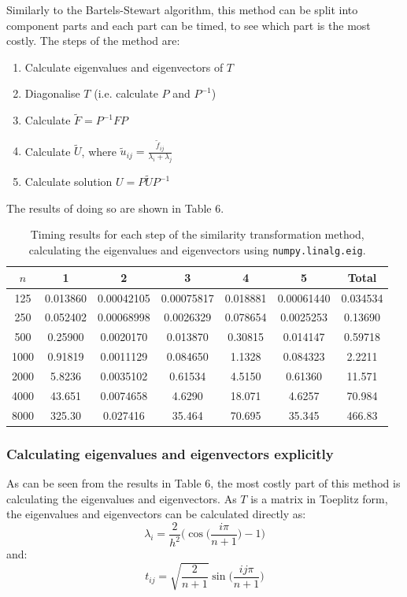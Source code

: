 \documentclass{article}
\numberwithin{equation}{section}
\begin{document}
Similarly to the Bartels-Stewart algorithm, this method can be split into component parts and each part can be timed, to see which part is the most costly. The steps of the method are:
\begin{enumerate}
\item Calculate eigenvalues and eigenvectors of $T$
\item Diagonalise $T$ (i.e. calculate $P$ and $P^{-1}$)
\item Calculate $\widetilde{F}=P^{-1}FP$
\item Calculate $\widetilde{U}$, where $\widetilde{u}_{ij} = \frac{\widetilde{f}_{ij}}{\lambda_i + \lambda_j}$
\item Calculate solution $U=P \widetilde{U}P^{-1}$
\end{enumerate}

The results of doing so are shown in Table 6.

\begin{table}[H]
\centering
\begin{tabular}{|c|c|c|c|c|c|c|}
\hline
$n$ & 1 & 2 & 3 & 4 & 5 & Total \\
\hline
125 & 0.013860 & 0.00042105 & 0.00075817 & 0.018881 & 0.00061440 & 0.034534 \\
250 & 0.052402 & 0.00068998 & 0.0026329 & 0.078654 & 0.0025253 & 0.13690 \\
500 & 0.25900 & 0.0020170 & 0.013870 & 0.30815 & 0.014147 & 0.59718 \\
1000 & 0.91819 & 0.0011129 & 0.084650 & 1.1328 & 0.084323 & 2.2211 \\
2000 & 5.8236 & 0.0035102 & 0.61534 & 4.5150 & 0.61360 & 11.571 \\
4000 & 43.651 & 0.0074658 & 4.6290 & 18.071 & 4.6257 & 70.984 \\
8000 & 325.30 & 0.027416 & 35.464 & 70.695 & 35.345 & 466.83 \\
\hline
\end{tabular}
\captionsetup{justification=centering}
\caption{Timing results for each step of the similarity transformation method, calculating the eigenvalues and eigenvectors using \texttt{numpy.linalg.eig}.}
\end{table}

\subsubsection*{Calculating eigenvalues and eigenvectors explicitly}

As can be seen from the results in Table 6, the most costly part of this method is calculating the eigenvalues and eigenvectors. As $T$ is a matrix in Toeplitz form, the eigenvalues and eigenvectors can be calculated directly as:
\[ \lambda_i = \frac{2}{h^2} \Big( \cos \Big( \frac{i \pi}{n+1} \Big) - 1 \Big) \]
and:
\[ t_{ij} = \sqrt{\frac{2}{n+1}} \sin \Big( \frac{ij \pi}{n+1}  \Big) \]
\end{document}
